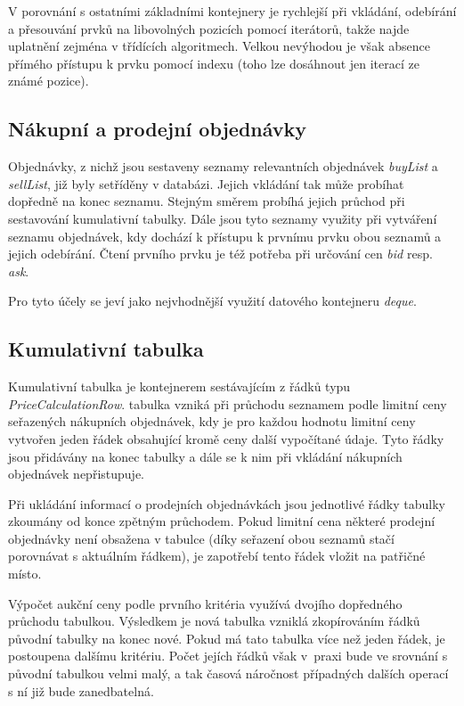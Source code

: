 \documentclass[thesis=M,czech]{FITthesis}[2012/06/26]
\begin{document}
V porovnání s ostatními základními kontejnery je rychlejší při vkládání, odebírání a přesouvání prvků na libovolných pozicích 
pomocí iterátorů, takže najde uplatnění zejména v třídících algoritmech. Velkou nevýhodou je však absence přímého 
přístupu k prvku pomocí indexu (toho lze dosáhnout jen iterací ze známé pozice). \cite{cpplist}


\subsection{Nákupní a prodejní objednávky}

Objednávky, z nichž jsou sestaveny seznamy relevantních objednávek \textit{buyList} a \textit{sellList}, již byly setříděny 
v databázi. Jejich vkládání tak může probíhat dopředně na konec seznamu. Stejným směrem probíhá jejich průchod při 
sestavování kumulativní tabulky. Dále jsou tyto seznamy využity při vytváření seznamu objednávek, kdy dochází k přístupu 
k prvnímu prvku obou seznamů a jejich odebírání. Čtení prvního prvku je též potřeba při určování cen \textit{bid} resp.
\textit{ask}. 

Pro tyto účely se jeví jako nejvhodnější využití datového kontejneru \textit{deque}.


\subsection{Kumulativní tabulka}

Kumulativní tabulka je kontejnerem sestávajícím z řádků typu \textit{PriceCalculationRow}.  tabulka vzniká při 
průchodu seznamem podle limitní ceny seřazených nákupních objednávek, kdy je pro každou hodnotu limitní ceny vytvořen 
jeden řádek obsahující kromě ceny další vypočítané údaje. Tyto řádky jsou přidávány na konec tabulky a dále se k nim při 
vkládání nákupních objednávek nepřistupuje.

Při ukládání informací o prodejních objednávkách jsou jednotlivé řádky tabulky zkoumány od konce zpětným průchodem. 
Pokud limitní cena některé prodejní objednávky není obsažena v tabulce (díky seřazení obou seznamů stačí porovnávat 
s aktuálním řádkem), je zapotřebí tento řádek vložit na patřičné místo.

Výpočet aukční ceny podle prvního kritéria využívá dvojího dopředného průchodu tabulkou. Výsledkem je nová tabulka vzniklá 
zkopírováním  řádků původní tabulky na konec nové. Pokud má tato tabulka více než jeden řádek, je postoupena 
dalšímu kritériu. Počet jejích řádků však v~praxi bude ve srovnání s původní tabulkou velmi malý, a tak časová náročnost 
případných dalších operací s ní již bude zanedbatelná.
\end{document}
